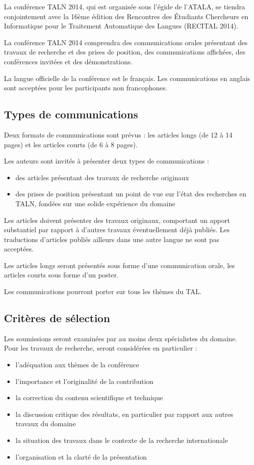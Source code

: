 \documentclass[10pt,a4paper,twoside]{article}
\begin{document}
La conférence TALN 2014, qui est organisée sous l’égide de l’ATALA, se tiendra conjointement avec la 16ème édition des Rencontres des Étudiants Chercheurs en Informatique pour le Traitement Automatique des Langues (RECITAL 2014).

La conférence TALN 2014 comprendra des communications orales présentant des travaux de recherche et des prises de position, des communications affichées, des conférences invitées et des démonstrations.

La langue officielle de la conférence est le français. Les communications en anglais sont acceptées pour les participants non francophones.


\subsection{Types de communications}

Deux formats de communications sont prévus : les articles longs (de 12 à 14 pages) et les articles courts (de 6 à 8 pages).

Les auteurs sont invités à présenter deux types de communications :
\begin{itemize}
   \item des articles présentant des travaux de recherche originaux
   \item des prises de position présentant un point de vue sur l’état des recherches en TALN, fondées sur une solide expérience du domaine
\end{itemize}

Les articles doivent présenter des travaux originaux, comportant un apport substantiel par rapport à d’autres travaux éventuellement déjà publiés. Les traductions d’articles publiés ailleurs dans une autre langue ne sont pas acceptées.

Les articles longs seront présentés sous forme d’une communication orale, les articles courts sous forme d’un poster.

Les communications pourront porter sur tous les thèmes du TAL.

\subsection{Critères de sélection}

Les soumissions seront examinées par au moins deux spécialistes du domaine. Pour les travaux de recherche, seront considérées en particulier :
\begin{itemize}
 \item  l’adéquation aux thèmes de la conférence
 \item  l’importance et l’originalité de la contribution
 \item  la correction du contenu scientifique et technique
 \item  la discussion critique des résultats, en particulier par rapport aux autres travaux du domaine
 \item  la situation des travaux dans le contexte de la recherche internationale
 \item  l’organisation et la clarté de la présentation
\end{itemize}
\end{document}
